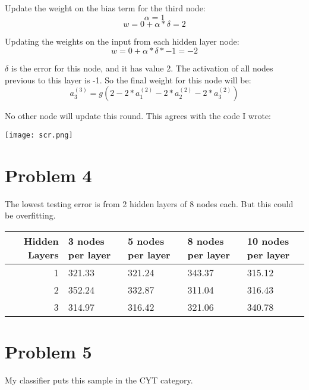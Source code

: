 \documentclass{article}
\begin{document}
Update the weight on the bias term for the third node:
\[\alpha = 1\]
\[w = 0 + \alpha * \delta = 2\]

Updating the weights on the input from each hidden layer node:
\[w = 0 + \alpha * \delta * -1 = -2\]

$\delta$ is the error for this node, and it has value 2. The activation of all
nodes previous to this layer is -1. So the final weight for this node will be:
\[a_3^{(3)} = g(2 - 2*a_1^{(2)} - 2*a_2^{(2)} - 2*a_3^{(2)}) \]

No other node will update this round. This agrees with the code I wrote:
\nbstop

\begin{center}
\texttt{[image: scr.png]}
\end{center}


\section*{Problem 4}
The lowest testing error is from 2 hidden layers of 8 nodes each. But this could be overfitting.

\begin{tabular}{r l l l l}
Hidden Layers & 3 nodes per layer & 5 nodes per layer & 8 nodes per layer & 10 nodes per layer \\
\hline
1 & 321.33 & 321.24 & 343.37 & 315.12 \\
2 & 352.24 & 332.87 & 311.04 & 316.43 \\
3 & 314.97 & 316.42 & 321.06 & 340.78
\end{tabular}

\section*{Problem 5}
\nblock
My classifier puts this sample in the CYT category.
\nbstop
\end{document}
